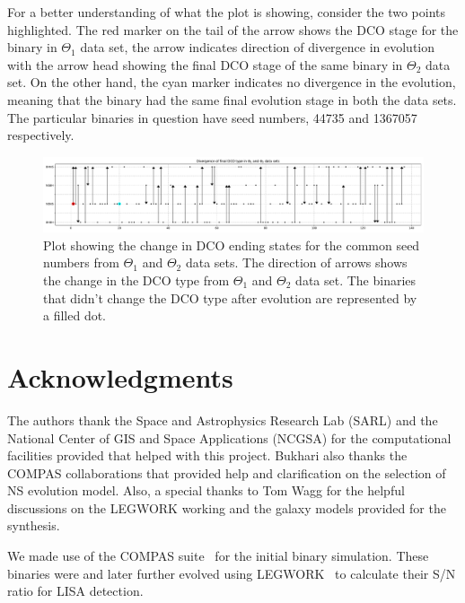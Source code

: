 \documentclass[twocolumn, twocolappendix]{aastex63}
\begin{document}
    For a better understanding of what the plot is showing, consider the two points highlighted.
    The red marker on the tail of the arrow shows the DCO stage for the binary in $\Theta_1$ data set, the arrow indicates direction of divergence in evolution with the arrow head showing the final DCO stage of the same binary in $\Theta_2$ data set.
    On the other hand, the cyan marker indicates no divergence in the evolution, meaning that the binary had the same final evolution stage in both the data sets.
    The particular binaries in question have seed numbers, 44735 and 1367057 respectively.

    \begin{figure}
        \centering
        \includegraphics[width=\linewidth]{analysis_data/004__images_for_latex/dco_type_divergence_in_two_datasets}
        \caption{Plot showing the change in DCO ending states for the common seed numbers from $\Theta_1$ and $\Theta_2$ data sets. The direction of arrows shows the change in the DCO type from $\Theta_1$ and $\Theta_2$ data set. The binaries that didn't change the DCO type after evolution are represented by a filled dot.}
        \label{fig:dcotypedivergenceintwodatasets}
    \end{figure}


    \section{Acknowledgments}
    \label{sec:acknowledgments}

    The authors thank the Space and Astrophysics Research Lab (SARL) and the National Center of GIS and Space Applications (NCGSA) for the computational facilities provided that helped with this project.
    Bukhari also thanks the COMPAS collaborations that provided help and clarification on the selection of NS evolution model.
    Also, a special thanks to Tom Wagg for the helpful discussions on the LEGWORK working and the galaxy models provided for the synthesis.

    We made use of the COMPAS suite~\citep{Riley2022} for the initial binary simulation.
    These binaries were and later further evolved using LEGWORK~\citep{Wagg2021LW} to calculate their S/N ratio for LISA detection.
\end{document}
